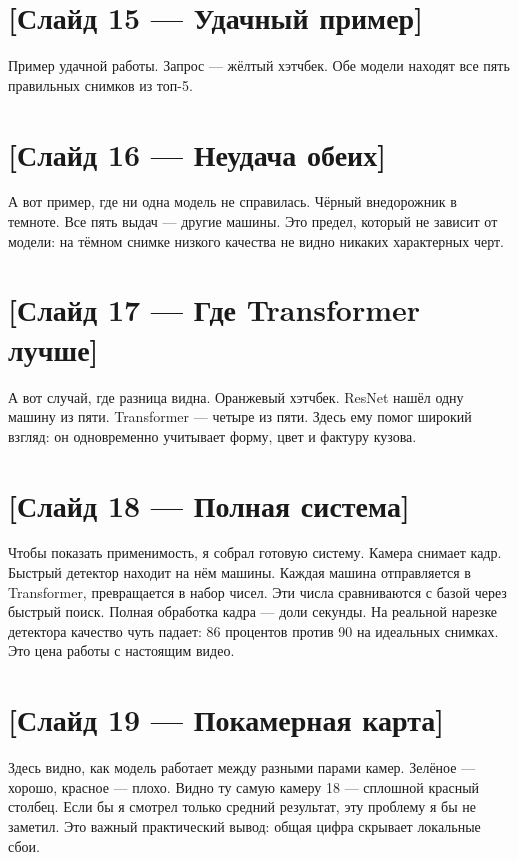 \documentclass[a4paper,12pt]{article}
\begin{document}
\section*{[Слайд 15 — Удачный пример]}

Пример удачной работы. Запрос — жёлтый хэтчбек. Обе модели находят все пять правильных снимков из топ-5.

\section*{[Слайд 16 — Неудача обеих]}

А вот пример, где ни одна модель не справилась. Чёрный внедорожник в темноте. Все пять выдач — другие машины. Это предел, который не зависит от модели: на тёмном снимке низкого качества не видно никаких характерных черт.

\section*{[Слайд 17 — Где Transformer лучше]}

А вот случай, где разница видна. Оранжевый хэтчбек. ResNet нашёл одну машину из пяти. Transformer — четыре из пяти. Здесь ему помог широкий взгляд: он одновременно учитывает форму, цвет и фактуру кузова.

\section*{[Слайд 18 — Полная система]}

Чтобы показать применимость, я собрал готовую систему. Камера снимает кадр. Быстрый детектор находит на нём машины. Каждая машина отправляется в Transformer, превращается в набор чисел. Эти числа сравниваются с базой через быстрый поиск. Полная обработка кадра — доли секунды. На реальной нарезке детектора качество чуть падает: 86 процентов против 90 на идеальных снимках. Это цена работы с настоящим видео.

\section*{[Слайд 19 — Покамерная карта]}

Здесь видно, как модель работает между разными парами камер. Зелёное — хорошо, красное — плохо. Видно ту самую камеру 18 — сплошной красный столбец. Если бы я смотрел только средний результат, эту проблему я бы не заметил. Это важный практический вывод: общая цифра скрывает локальные сбои.
\end{document}
